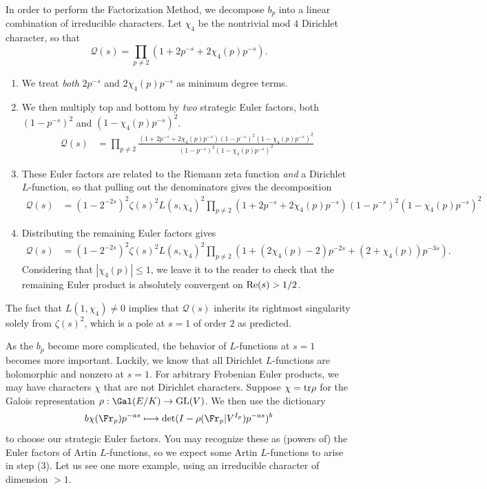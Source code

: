 \documentclass[12pt]{amsart}
\newenvironment{BOXexample}{
\begin{exbox}\mbox{}
\begin{example}
}
{
\end{example}
\end{exbox}
}
\theoremstyle{plain}
\begin{document}
\begin{BOXexample}
In order to perform the Factorization Method, we decompose $b_p$ into a linear combination of irreducible characters. Let $\chi_4$ be the nontrivial mod $4$ Dirichlet character, so that
\[
\mathcal{Q}(s) = \prod_{p\ne 2} (1 + 2p^{-s} +2\chi_4(p)p^{-s}).
\]
\begin{enumerate}[(1)]
    \item We treat \emph{both} $2p^{-s}$ and $2\chi_4(p)p^{-s}$ as minimum degree terms.
    \item We then multiply top and bottom by \emph{two} strategic Euler factors, both $(1-p^{-s})^{2}$ and $(1 - \chi_4(p)p^{-s})^{2}$.
    \begin{align*}
        \mathcal{Q}(s) &= \prod_{p\ne 2} \frac{(1 + 2p^{-s} +2\chi_4(p)p^{-s})(1-p^{-s})^2(1-\chi_4(p)p^{-s})^2}{(1-p^{-s})^2(1-\chi_4(p)p^{-s})^2}
    \end{align*}
    \item These Euler factors are related to the Riemann zeta function \emph{and} a Dirichlet $L$-function, so that pulling out the denominators gives the decomposition
    \begin{align*}
        \mathcal{Q}(s) %
        &=(1-2^{-2s})^2 \zeta(s)^2L(s,\chi_4)^2\prod_{p\ne 2} (1 + 2p^{-s} +2\chi_4(p)p^{-s})(1-p^{-s})^2(1-\chi_4(p)p^{-s})^2
    \end{align*}
    \item Distributing the remaining Euler factors gives
    \begin{align*}
        \mathcal{Q}(s)&=(1-2^{-2s})^2 \zeta(s)^2L(s,\chi_4)^2\prod_{p\ne 2}(1 + (2\chi_4(p)-2)p^{-2s} + (2 + \chi_4(p))p^{-3s}).
    \end{align*}
    Considering that $|\chi_4(p)|\le 1$, we leave it to the reader to check that the remaining Euler product is absolutely convergent on ${\rm Re}(s) > 1/2$.
\end{enumerate}

The fact that $L(1,\chi_4)\ne 0$ implies that $\mathcal{Q}(s)$ inherits its rightmost singularity solely from $\zeta(s)^2$, which is a pole at $s=1$ of order $2$ as predicted.
\end{BOXexample}

As the $b_p$ become more complicated, the behavior of $L$-functions at $s=1$ becomes more important. Luckily, we know that all Dirichlet $L$-functions are holomorphic and nonzero at $s=1$. For arbitrary Frobenian Euler products, we may have characters $\chi$ that are not Dirichlet characters. Suppose $\chi = {\rm tr}\rho$ for the Galois representation $\rho:\Gal(E/K)\to {\rm GL}(V)$. We then use the dictionary
\[
b \chi(\Fr_p) p^{-as} \longmapsto \det(I - \rho(\Fr_p|V^{I_p})p^{-as})^b
\]
to choose our strategic Euler factors. You may recognize these as (powers of) the Euler factors of Artin $L$-functions, so we expect some Artin $L$-functions to arise in step (3). Let us see one more example, using an irreducible character of dimension $>1$.
\end{document}
